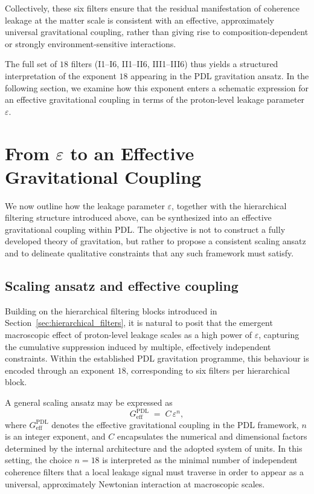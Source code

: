 \documentclass[11pt,a4paper]{article}
\theoremstyle{definition}
\newcommand{\PDL}{\mathrm{PDL}}
\begin{document}
Collectively, these six filters ensure that the residual manifestation of coherence leakage at the matter scale is consistent with an effective, approximately universal gravitational coupling, rather than giving rise to composition-dependent or strongly environment-sensitive interactions.\cite{Effective_Fields_PDL_2026}

The full set of $18$ filters (I1–I6, II1–II6, III1–III6) thus yields a structured interpretation of the exponent $18$ appearing in the PDL gravitation ansatz. In the following section, we examine how this exponent enters a schematic expression for an effective gravitational coupling in terms of the proton-level leakage parameter $\varepsilon$.

\section{From \texorpdfstring{$\varepsilon$}{epsilon} to an Effective Gravitational Coupling}
\label{sec:effective_gravity}

We now outline how the leakage parameter $\varepsilon$, together with the hierarchical filtering structure introduced above, can be synthesized into an effective gravitational coupling within PDL. The objective is not to construct a fully developed theory of gravitation, but rather to propose a consistent scaling ansatz and to delineate qualitative constraints that any such framework must satisfy.\cite{Exponent_18_PDL_2026,Effective_Fields_PDL_2026}

\subsection{Scaling ansatz and effective coupling}

Building on the hierarchical filtering blocks introduced in Section~\ref{sec:hierarchical_filters}, it is natural to posit that the emergent macroscopic effect of proton-level leakage scales as a high power of $\varepsilon$, capturing the cumulative suppression induced by multiple, effectively independent constraints. Within the established PDL gravitation programme, this behaviour is encoded through an exponent $18$, corresponding to six filters per hierarchical block.\cite{Exponent_18_PDL_2026}

A general scaling ansatz may be expressed as
\begin{equation}
 G_{\mathrm{eff}}^{\PDL} \;=\; C \,\varepsilon^{n},
 \label{eq:Geff_ansatz}
\end{equation}
where $G_{\mathrm{eff}}^{\PDL}$ denotes the effective gravitational coupling in the PDL framework, $n$ is an integer exponent, and $C$ encapsulates the numerical and dimensional factors determined by the internal architecture and the adopted system of units.\cite{Exponent_18_PDL_2026,Effective_Fields_PDL_2026} In this setting, the choice $n=18$ is interpreted as the minimal number of independent coherence filters that a local leakage signal must traverse in order to appear as a universal, approximately Newtonian interaction at macroscopic scales.\cite{Exponent_18_PDL_2026}
\end{document}

